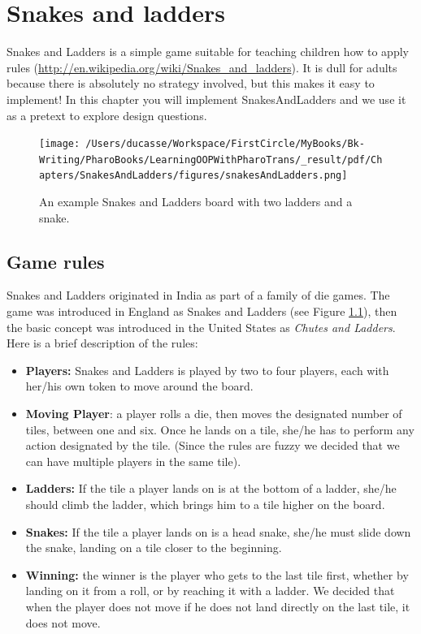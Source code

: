 \documentclass[10pt,twoside,english]{_support/latex/sbabook/sbabook}
\begin{document}
\frontmatter
\pagestyle{plain}

\tableofcontents*
\clearpage\listoffigures

\mainmatter

\chapter{Snakes and ladders}\label{cha:snakes}
Snakes and Ladders is a simple game suitable for teaching children how to apply rules (\url{http://en.wikipedia.org/wiki/Snakes_and_ladders}). It is dull for adults because there is absolutely no strategy involved, but this makes it easy to implement! 
In this chapter you will implement SnakesAndLadders and we use it as a pretext to explore design questions.


\begin{figure}

\begin{center}
\texttt{[image: /Users/ducasse/Workspace/FirstCircle/MyBooks/Bk-Writing/PharoBooks/LearningOOPWithPharoTrans/\_result/pdf/Chapters/SnakesAndLadders/figures/snakesAndLadders.png]}\caption{An example Snakes and Ladders board with two ladders and a snake.\label{fig:snakes}}\end{center}
\end{figure}

\section{Game rules}
Snakes and Ladders originated in India as part of a family of die games. The game was introduced in England as Snakes and Ladders (see Figure \ref{fig:snakes}), then the basic concept was introduced in the United States as \textit{Chutes and Ladders}.
Here is a brief description of the rules: 

\begin{itemize}
\item \textbf{Players:} Snakes and Ladders is played by two to four players, each with her/his own token to move around the board.
\item \textbf{Moving Player}: a player rolls a die, then moves the designated number of tiles, between one and six. Once he lands on a tile, she/he has to perform any action designated by the tile. (Since the rules are fuzzy we decided that we can have multiple players in the same tile).
\item \textbf{Ladders:} If the tile a player lands on is at the bottom of a ladder, she/he should climb the ladder, which brings him to a tile higher on the board.
\item \textbf{Snakes:} If the tile a player lands on is  a head snake, she/he must slide down the snake, landing on a tile closer to the beginning.
\item \textbf{Winning:} the winner is the player who gets to the last tile first, whether by landing on it from a roll, or by reaching it with a ladder. We  decided that when the player does not move if he does not land directly on the last tile, it does not move.
\end{itemize}
\end{document}
